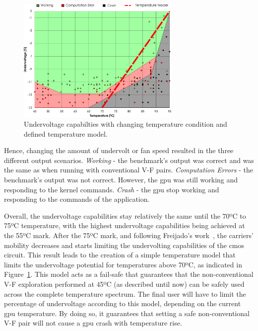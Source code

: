 \begin{figure}[htb]
    \centering
        \includegraphics[width=0.7\textwidth]{Figures/GPU_characterization/UndervoltageWithTemperature_new.pdf}
        \caption{Undervoltage capabilties with changing temperature condition and defined temperature model.}
    \label{fig:temp_model}
\end{figure}

Hence, changing the amount of undervolt or fan speed resulted in the three different output scenarios. 
\textit{Working} - the benchmark's output was correct and was the same as when running with conventional V-F pairs.
\textit{Computation Errors} - the benchmark's output was not correct. However, the \acrshort{gpu} was still working and responding to the kernel commands. \textit{Crash} - the \acrshort{gpu} stop working and responding to the commands of the application.

Overall, the undervoltage capabilities stay relatively the same until the 70ºC to 75ºC temperature, with the highest undervoltage capabilities being achieved at the 55ºC mark. After the 75ºC mark, and following Freijado's work~\cite{freijedo_modeling_2012}, the carriers' mobility decreases and starts limiting the undervolting capabilities of the \acrshort{cmos} circuit. This result leads to the creation of a simple temperature model that limits the undervoltage potential for temperatures above 70ºC, as indicated in Figure~\ref{fig:temp_model}. This model acts as a fail-safe that guarantees that the non-conventional V-F exploration performed at 45ºC (as described until now) can be safely used across the complete temperature spectrum. The final user will have to limit the percentage of undervoltage according to this model, depending on the current \acrshort{gpu} temperature. By doing so, it guarantees that setting a safe non-conventional V-F pair will not cause a \acrshort{gpu} crash with temperature rise.




